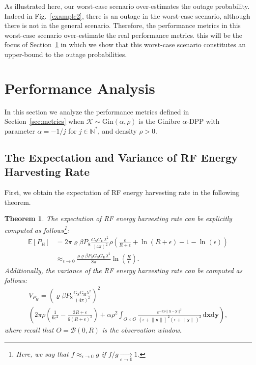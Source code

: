 \documentclass[12pt,draftclsnofoot,onecolumn]{IEEEtran}
\newtheorem{theorem}{Theorem}
\begin{document}
As illustrated here, our worst-case scenario over-estimates the outage probability. Indeed in Fig.~\ref{example2}, there is an outage in the worst-case scenario, although there is not in the general scenario. 
Therefore, the performance metrics in this worst-case scenario over-estimate the real performance metrics. this will be the focus of Section~\ref{sec:Analysis} in which we show that this worst-case scenario constitutes an upper-bound to the outage probabilities.

\section{Performance Analysis}
\label{sec:Analysis}

In this section we analyze the performance metrics defined in Section~\ref{sec:metrics} when $\mathcal{K}\sim\mathrm{Gin}(\alpha,\rho)$ is the Ginibre $\alpha$-DPP with parameter $\alpha=-1/j$ for $j\in\mathbb{N}^*$, and density $\rho>0$. 


\subsection{The Expectation and Variance of RF Energy Harvesting Rate}

First, we obtain the expectation of RF energy harvesting rate in the following theorem.
\begin{theorem}
\label{thm:expectedharvestedenergy}
The expectation of RF energy harvesting rate can be explicitly computed as follows\footnote{Here, we say that $f\approx_{\epsilon\rightarrow 0}g$ if $f/g\xrightarrow[\epsilon\to0]{}1$.}:
\begin{align}
\mathbb{E}[P_{\mathrm H}] &=2 \pi\varrho\beta P_{\mathrm{S}} \frac{G_{\mathrm{S}}G_{\mathrm{H}} \lambda^{2}}{(4\pi )^{2}}
\rho\left(\frac{\epsilon}{R+\epsilon}+\ln(R+\epsilon)-1-\ln(\epsilon)\right) \label{eq:average_energy} \\
&\approx_{\epsilon\rightarrow 0} \frac{\rho\varrho\beta P_{\mathrm{S}} G_{\mathrm{S}}G_{\mathrm{H}} \lambda^{2}}{8\pi}\ln\left(\frac R\epsilon\right)		.	\label{eq:app_average_energy}
\end{align}
Additionally, the variance of the RF energy harvesting rate can be computed as follows:
\begin{multline}
\label{eq:variance_harvested}
V_{P_H}=\left(\varrho \beta P_{\mathrm{S}} \frac{G_{\mathrm{S}} G_{\mathrm{H}} \lambda^{2}}{(4\pi )^{2}}\right)^2  \\
\left(2\pi\rho\left(\frac{1}{6\epsilon^2}-\frac{3R+\epsilon}{6(R+\epsilon)^3}\right)+\alpha\rho^2\int_{O\times O}\frac{e^{-\pi\rho\lVert \mathbf x-\mathbf y\lVert^2}}{\left(\epsilon+\lVert \mathbf x\lVert\right)^2\left(\epsilon+\lVert \mathbf y\lVert\right)^2}\,\mathrm d\mathbf x\mathrm d\mathbf y\right),
\end{multline}
where recall that $O=\mathcal B(0,R)$ is the observation window.
\end{theorem}
\end{document}

